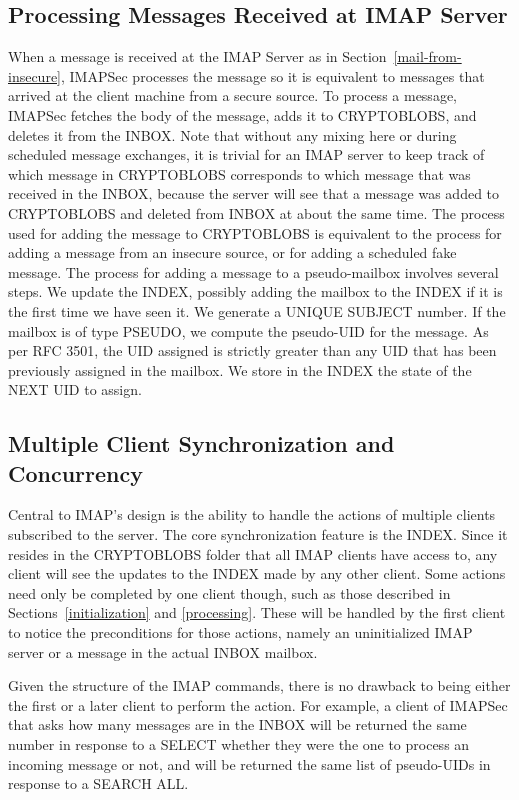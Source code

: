 \documentclass[pageno]{jpaper}
\newcommand{\project}{IMAPSec }
\begin{document}
\label{processing}
\subsection{Processing Messages Received at IMAP Server}
When a message is received at the IMAP Server as in Section~\ref{mail-from-insecure}, \project processes the message so it is equivalent to messages that arrived at the client machine from a secure source. To process a message, \project fetches the body of the message, adds it to CRYPTOBLOBS, and deletes it from the INBOX. Note that without any mixing here or during scheduled message exchanges, it is trivial for an IMAP server to keep track of which message in CRYPTOBLOBS corresponds to which message that was received in the INBOX, because the server will see that a message was added to CRYPTOBLOBS and deleted from INBOX at about the same time. The process used for adding the message to CRYPTOBLOBS is equivalent to the process for adding a message from an insecure source, or for adding a scheduled fake message. The process for adding a message to a pseudo-mailbox involves several steps. We update the INDEX, possibly adding the mailbox to the INDEX if it is the first time we have seen it. We generate a UNIQUE SUBJECT number. If the mailbox is of type PSEUDO, we compute the pseudo-UID for the message. As per RFC 3501, the UID assigned is strictly greater than any UID that has been previously assigned in the mailbox. We store in the INDEX the state of the NEXT UID to assign.


\subsection{Multiple Client Synchronization and Concurrency}
Central to IMAP's design is the ability to handle the actions of multiple clients subscribed to the server. The core synchronization feature is the INDEX. Since it resides in the CRYPTOBLOBS folder that all IMAP clients have access to, any client will see the updates to the INDEX made by any other client. Some actions need only be completed by one client though, such as those described in Sections~\ref{initialization} and \ref{processing}. These will be handled by the first client to notice the preconditions for those actions, namely an uninitialized IMAP server or a message in the actual INBOX mailbox.

Given the structure of the IMAP commands, there is no drawback to being either the first or a later client to perform the action. For example, a client of \project that asks how many messages are in the INBOX will be returned the same number in response to a SELECT whether they were the one to process an incoming message or not, and will be returned the same list of pseudo-UIDs in response to a SEARCH ALL.
\end{document}
